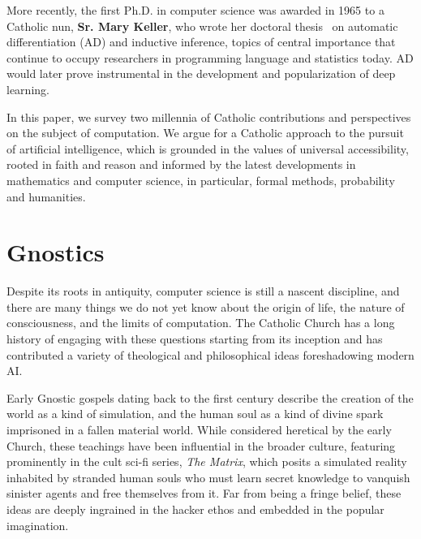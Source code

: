 \documentclass[sigplan,nonacm]{acmart}\settopmatter{printfolios=false,printccs=false,printacmref=false}
\begin{document}

  More recently, the first Ph.D. in computer science was awarded in 1965 to a Catholic nun, \textbf{Sr. Mary Keller}, who wrote her doctoral thesis~\cite{keller1965inductive} on automatic differentiation (AD) and inductive inference, topics of central importance that continue to occupy researchers in programming language and statistics today. AD would later prove instrumental in the development and popularization of deep learning.

  In this paper, we survey two millennia of Catholic contributions and perspectives on the subject of computation. We argue for a Catholic approach to the pursuit of artificial intelligence, which is grounded in the values of universal accessibility, rooted in faith and reason and informed by the latest developments in mathematics and computer science, in particular, formal methods, probability and humanities.

 \section{Gnostics}

  Despite its roots in antiquity, computer science is still a nascent discipline, and there are many things we do not yet know about the origin of life, the nature of consciousness, and the limits of computation. The Catholic Church has a long history of engaging with these questions starting from its inception and has contributed a variety of theological and philosophical ideas foreshadowing modern AI.

  Early Gnostic gospels dating back to the first century describe the creation of the world as a kind of simulation, and the human soul as a kind of divine spark imprisoned in a fallen material world. While considered heretical by the early Church, these teachings have been influential in the broader culture, featuring prominently in the cult sci-fi series, \textit{The Matrix}, which posits a simulated reality inhabited by stranded human souls who must learn secret knowledge to vanquish sinister agents and free themselves from it. Far from being a fringe belief, these ideas are deeply ingrained in the hacker ethos and embedded in the popular imagination.
\end{document}
